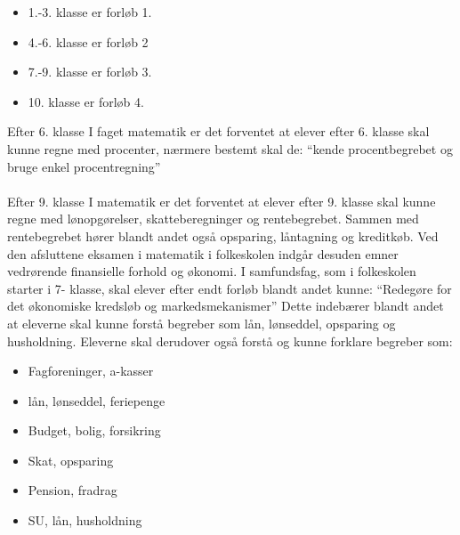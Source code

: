 \noindent \begin{itemize}
\item{1.-3. klasse er forløb 1.}
\item{4.-6. klasse er forløb 2}
\item{7.-9. klasse er forløb 3.}
\item{10. klasse er forløb 4.}\\
\end{itemize}

Efter 6. klasse
I faget matematik er det forventet at elever efter 6. klasse skal kunne regne med procenter,
nærmere bestemt skal de: “kende procentbegrebet og bruge enkel procentregning” \cite{FallesMalMatematik}\\
\\
Efter 9. klasse
I matematik er det forventet at elever efter 9. klasse skal kunne regne med lønopgørelser, skatteberegninger og rentebegrebet.  Sammen med rentebegrebet hører blandt andet også opsparing, låntagning og kreditkøb.
Ved den afsluttene eksamen i matematik i folkeskolen indgår desuden emner vedrørende finansielle forhold og økonomi.
I samfundsfag, som i folkeskolen starter i 7- klasse, skal elever efter endt forløb blandt andet kunne: “Redegøre for det økonomiske kredsløb og markedsmekanismer” \cite{FallesMalSamfundsfag}
Dette indebærer blandt andet at eleverne skal kunne forstå begreber som lån, lønseddel, opsparing og husholdning.
Eleverne skal derudover også forstå og kunne forklare begreber som: 

\noindent \begin{itemize}
\item{Fagforeninger, a-kasser}
\item{lån, lønseddel, feriepenge}
\item{Budget, bolig, forsikring}
\item{Skat, opsparing}
\item{Pension, fradrag}
\item{SU, lån, husholdning}
\cite{FallesMalMatematik}\\
\end{itemize}

